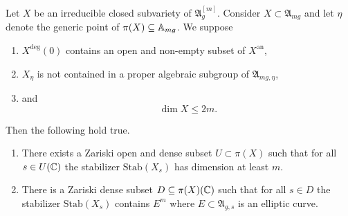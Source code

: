 \documentclass[12pt,oneside]{amsart}
\begin{document}
\begin{theorem}
  \label{thm:deg0}
  Let $X$ be an irreducible closed subvariety of
  $\mathfrak{A}_g^{[m]}$. Consider $X \subset \mathfrak{A}_{mg}$ and let
  $\eta$ denote the generic point of $\pi(X)\subseteq{\mathbb{A}}_{mg}$. We suppose
  \begin{enumerate}
  \item [(a)]
    $X^{\mathrm{deg}}(0)$ contains an open and non-empty subset of
    $X^{\mathrm{an}}$,
  \item[(b)]
    $X_\eta$ is not contained in a proper algebraic subgroup of
    $\mathfrak{A}_{mg,\eta}$,
  \item[(c)] and
    \begin{equation}
      \label{eq:dimhyp}
      \dim X \le 2m.
    \end{equation}
  \end{enumerate}
  Then the following hold true.
  \begin{enumerate}
  \item [(i)]  There exists a Zariski open and dense subset $U\subset \pi(X)$ such
  that 
   for all $s\in U({\mathbb{C}})$ the stabilizer $ \mathrm{Stab}(X_s)$ has
   dimension at least $m$.
  \item[(ii)] There is a Zariski dense subset $D\subseteq \pi(X)({\mathbb{C}})$ such
  that for all $s\in D$ the stabilizer $\mathrm{Stab}(X_s)$
  contains $E^m$ where $E\subset \mathfrak{A}_{g,s}$ is an elliptic
  curve. 
  \end{enumerate}
\end{theorem}
\end{document}
